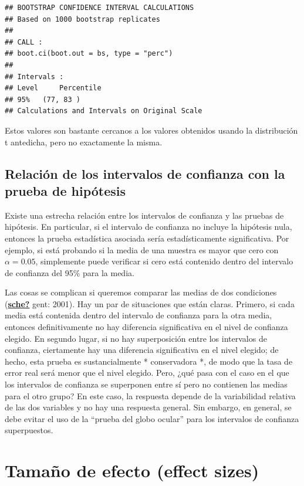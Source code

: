 \documentclass[
  12pt,
]{book}
\theoremstyle{definition}
\theoremstyle{definition}
\theoremstyle{definition}
\theoremstyle{remark}
\begin{document}
\begin{verbatim}
## BOOTSTRAP CONFIDENCE INTERVAL CALCULATIONS
## Based on 1000 bootstrap replicates
## 
## CALL : 
## boot.ci(boot.out = bs, type = "perc")
## 
## Intervals : 
## Level     Percentile     
## 95%   (77, 83 )  
## Calculations and Intervals on Original Scale
\end{verbatim}

Estos valores son bastante cercanos a los valores obtenidos usando la distribución t antedicha, pero no exactamente la misma.

\hypertarget{relaciuxf3n-de-los-intervalos-de-confianza-con-la-prueba-de-hipuxf3tesis}{%
\subsection{Relación de los intervalos de confianza con la prueba de hipótesis}\label{relaciuxf3n-de-los-intervalos-de-confianza-con-la-prueba-de-hipuxf3tesis}}

Existe una estrecha relación entre los intervalos de confianza y las pruebas de hipótesis. En particular, si el intervalo de confianza no incluye la hipótesis nula, entonces la prueba estadística asociada sería estadísticamente significativa. Por ejemplo, si está probando si la media de una muestra es mayor que cero con \(\alpha = 0.05\), simplemente puede verificar si cero está contenido dentro del intervalo de confianza del 95\% para la media.

Las cosas se complican si queremos comparar las medias de dos condiciones (\protect\hyperlink{ref-sche}{\textbf{sche?}} gent: 2001). Hay un par de situaciones que están claras. Primero, si cada media está contenida dentro del intervalo de confianza para la otra media, entonces definitivamente no hay diferencia significativa en el nivel de confianza elegido. En segundo lugar, si no hay superposición entre los intervalos de confianza, ciertamente hay una diferencia significativa en el nivel elegido; de hecho, esta prueba es sustancialmente * conservadora *, de modo que la tasa de error real será menor que el nivel elegido. Pero, ¿qué pasa con el caso en el que los intervalos de confianza se superponen entre sí pero no contienen las medias para el otro grupo? En este caso, la respuesta depende de la variabilidad relativa de las dos variables y no hay una respuesta general. Sin embargo, en general, se debe evitar el uso de la ``prueba del globo ocular'' para los intervalos de confianza superpuestos.

\hypertarget{tamauxf1o-de-efecto-effect-sizes}{%
\section{Tamaño de efecto (effect sizes)}\label{tamauxf1o-de-efecto-effect-sizes}}
\end{document}
